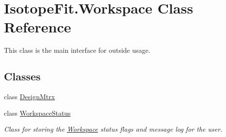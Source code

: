 \hypertarget{class_isotope_fit_1_1_workspace}{}\section{Isotope\+Fit.\+Workspace Class Reference}
\label{class_isotope_fit_1_1_workspace}


This class is the main interface for outside usage.  


\subsection*{Classes}
\begin{DoxyCompactItemize}
\item 
class \hyperlink{class_isotope_fit_1_1_workspace_1_1_design_mtrx}{Design\+Mtrx}
\item 
class \hyperlink{class_isotope_fit_1_1_workspace_1_1_workspace_status}{Workspace\+Status}
\begin{DoxyCompactList}\small\item\em Class for storing the \hyperlink{class_isotope_fit_1_1_workspace}{Workspace} status flags and message log for the user. \end{DoxyCompactList}\end{DoxyCompactItemize}
